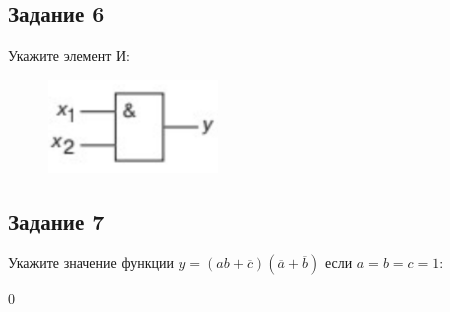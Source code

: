 \documentclass[bachelor, och, labwork]{shiza}
\begin{document}
   
\subsection{Задание 6}
    Укажите элемент И:
    
    \begin{figure}[H]
        \centering
        \includegraphics[width=0.4\textwidth]{pic1/4.png}
    \end{figure}

\subsection{Задание 7}
    Укажите значение функции $y = (ab + \overline{c})(\overline{a} + \overline{b})$ если $a = b = c = 1$:
    
    0
\end{document}
